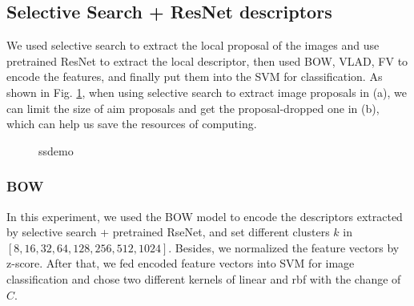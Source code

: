\documentclass[conference]{IEEEtran}
\begin{document}
\subsection{Selective Search + ResNet descriptors}

We used selective search to extract the local proposal of the images and use pretrained ResNet to extract the local descriptor, then used BOW, VLAD, FV to encode the features, and finally put them into the SVM for classification. As shown in Fig. \ref{kFig3}, when using selective search to extract image proposals in (a), we can limit the size of aim proposals and get the proposal-dropped one in (b), which can help us save the resources of computing.
\begin{center}
	\begin{figure}
		\centering
		\caption{ssdemo}
		\label{kFig3}
	\end{figure}
\end{center}
\subsubsection{BOW}
\label{sec:z-score}
In this experiment, we used the BOW model to encode the descriptors extracted by selective search + pretrained RseNet, and set different clusters $k$ in $[8,16,32,64,128,256,512,1024]$. Besides, we normalized the feature vectors by z-score. After that, we fed encoded feature vectors into SVM for image classification and chose two different kernels of linear and rbf with the change of $C$.
\end{document}
